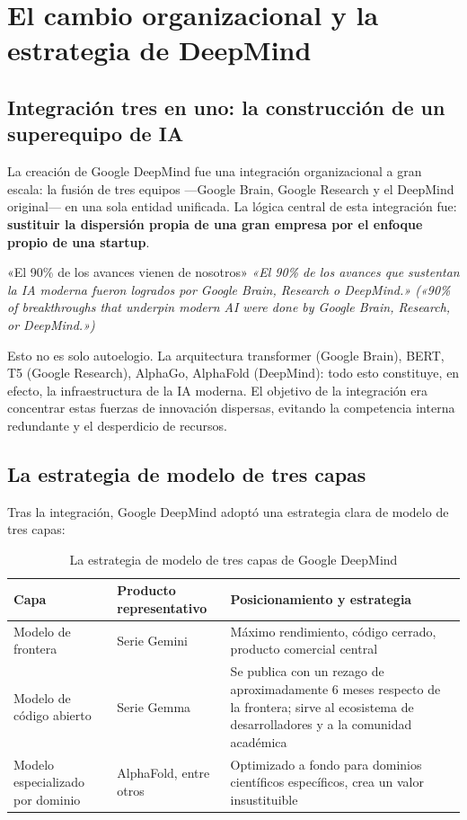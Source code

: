 \section{El cambio organizacional y la estrategia de DeepMind}

\subsection{Integración tres en uno: la construcción de un superequipo de IA}

La creación de Google DeepMind fue una integración organizacional a gran escala: la fusión de tres equipos —Google Brain, Google Research y el DeepMind original— en una sola entidad unificada. La lógica central de esta integración fue: \textbf{sustituir la dispersión propia de una gran empresa por el enfoque propio de una startup}.

\begin{importantbox}{«El 90\% de los avances vienen de nosotros»}
\textit{«El 90\% de los avances que sustentan la IA moderna fueron logrados por Google Brain, Research o DeepMind.» («90\% of breakthroughs that underpin modern AI were done by Google Brain, Research, or DeepMind.»)}

Esto no es solo autoelogio. La arquitectura transformer (Google Brain), BERT, T5 (Google Research), AlphaGo, AlphaFold (DeepMind): todo esto constituye, en efecto, la infraestructura de la IA moderna. El objetivo de la integración era concentrar estas fuerzas de innovación dispersas, evitando la competencia interna redundante y el desperdicio de recursos.
\end{importantbox}

\subsection{La estrategia de modelo de tres capas}

Tras la integración, Google DeepMind adoptó una estrategia clara de modelo de tres capas:

\begin{table}[H]
\centering
\begin{tabular}{p{} p{} p{}}
\toprule
\textbf{Capa} & \textbf{Producto representativo} & \textbf{Posicionamiento y estrategia} \\
\midrule
Modelo de frontera & Serie Gemini & Máximo rendimiento, código cerrado, producto comercial central \\
Modelo de código abierto & Serie Gemma & Se publica con un rezago de aproximadamente 6 meses respecto de la frontera; sirve al ecosistema de desarrolladores y a la comunidad académica \\
Modelo especializado por dominio & AlphaFold, entre otros & Optimizado a fondo para dominios científicos específicos, crea un valor insustituible \\
\bottomrule
\end{tabular}
\caption{La estrategia de modelo de tres capas de Google DeepMind}
\end{table}

